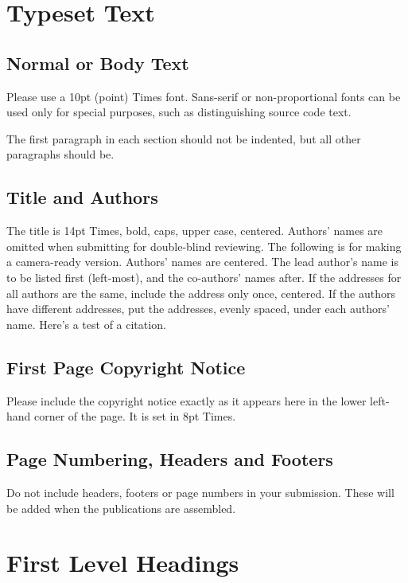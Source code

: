 \documentclass{article}
\begin{document}
\section{Typeset Text}\label{sec:typeset_text}

\subsection{Normal or Body Text}\label{subsec:body}

Please use a 10pt (point) Times font. Sans-serif or non-proportional fonts
can be used only for special purposes, such as distinguishing source code text.

The first paragraph in each section should not be indented, but all other paragraphs should be.

\subsection{Title and Authors}

The title is 14pt Times, bold, caps, upper case, centered.
Authors' names are omitted when submitting for double-blind reviewing.
The following is for making a camera-ready version.
Authors' names are centered.
The lead author's name is to be listed first (left-most), and the co-authors' names after.
If the addresses for all authors are the same, include the address only once, centered.
If the authors have different addresses, put the addresses, evenly spaced, under each authors' name.
Here's a test of a citation. %

\subsection{First Page Copyright Notice}

Please include the copyright notice exactly as it appears here in the lower left-hand corner of the page.
It is set in 8pt Times.

\subsection{Page Numbering, Headers and Footers}

Do not include headers, footers or page numbers in your submission.
These will be added when the publications are assembled.

\section{First Level Headings}
\end{document}
